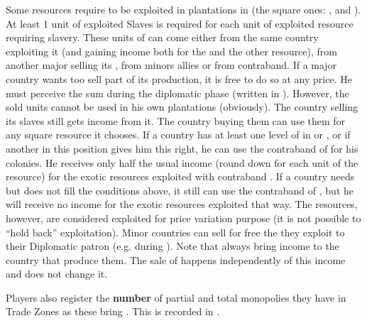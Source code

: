 \label{chIncomes:NeedSlaves}
Some resources require  to be exploited in plantations in
 (the square ones: ,  and ). At least 1 unit of exploited Slaves is
required for each unit of exploited resource requiring slavery.
 These units of  can come either
from the same country exploiting it (and gaining income both for the
 and the other resource), from another major selling its
, from minors allies or from contraband.
 If a major country wants too sell part of
its  production, it is free to do so at any price. He must
perceive the sum during the diplomatic phase (written in
). However, the sold  units
cannot be used in his own plantations (obviously). The country selling
its slaves still gets income from it. The country buying them can use
them for any square resource it chooses.
 If a country has at least one level of
\TradeFLEET in  or , or if another \MAJ in this
position gives him this right, he can use the contraband of
 for his colonies. He receives only half the usual income
(round down for each unit of the resource) for the exotic resources
exploited with contraband .
 If a country needs  but
does not fill the conditions above, it still can use the contraband of
, but he will receive no income for the exotic resources
exploited that way. The resources, however, are considered exploited for
price variation purpose (it is not possible to ``hold back''
exploitation).
 Minor countries can sell for free the
 they exploit to their Diplomatic patron
(e.g.  during ).
\bparag Note that  always bring income to the country that
produce them. The sale of  happens independently of this
income and does not change it.

\aparag Players also register the \textbf{number} of partial and total
monopolies they have in Trade Zones as these bring \VPs. This is
recorded in .

